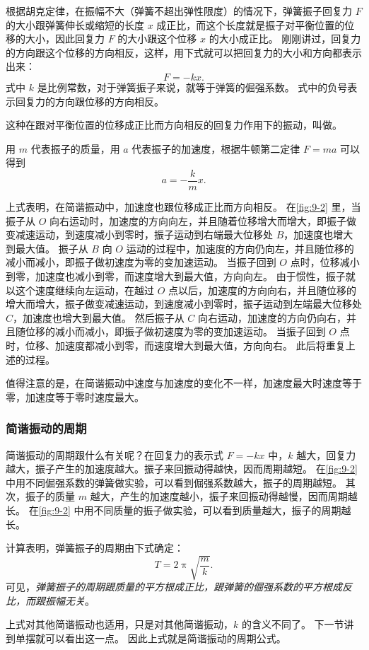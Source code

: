 根据胡克定律，在振幅不大（弹簧不超出弹性限度）的情况下，弹簧振子回复力 $F$ 的大小跟弹簧伸长或缩短的长度 $x$ 成正比，而这个长度就是振子对平衡位置的位移的大小，因此回复力 $F$ 的大小跟这个位移 $x$ 的大小成正比。
刚刚讲过，回复力的方向跟这个位移的方向相反，这样，用下式就可以把回复力的大小和方向都表示出来：
\[F=-kx.\]
式中 $k$ 是比例常数，对于弹簧振子来说，就等于弹簧的倔强系数。
式中的负号表示回复力的方向跟位移的方向相反。

这种在跟对平衡位置的位移成正比而方向相反的回复力作用下的振动，叫做。

用 $m$ 代表振子的质量，用 $a$ 代表振子的加速度，根据牛顿第二定律 $F=ma$ 可以得到
\[a=-\frac{k}{m}x.\]

上式表明，在简谐振动中，加速度也跟位移成正比而方向相反。
在\cref{fig:9-2} 里，当振子从 $O$ 向右运动时，加速度的方向向左，并且随着位移增大而增大，即振子做变减速运动，到速度减小到零时，振子运动到右端最大位移处 $B$，加速度也增大到最大值。
振子从 $B$ 向 $O$ 运动的过程中，加速度的方向仍向左，并且随位移的减小而减小，即振子做初速度为零的变加速运动。
当振子回到 $O$ 点时，位移减小到零，加速度也减小到零，而速度增大到最大值，方向向左。
由于惯性，振子就以这个速度继续向左运动，在越过 $O$ 点以后，加速度的方向向右，并且随位移的增大而增大，振子做变减速运动，到速度减小到零时，振子运动到左端最大位移处 $C$，加速度也增大到最大值。
然后振子从 $C$ 向右运动，加速度的方向仍向右，并且随位移的减小而减小，即振子做初速度为零的变加速运动。
当振子回到 $O$ 点时，位移、加速度都减小到零，而速度增大到最大值，方向向右。
此后将重复上述的过程。

值得注意的是，在简谐振动中速度与加速度的变化不一样，加速度最大时速度等于零，加速度等于零时速度最大。

\subsubsection{简谐振动的周期}
简谐振动的周期跟什么有关呢？在回复力的表示式 $F=-kx$ 中，$k$ 越大，回复力越大，振子产生的加速度越大。振子来回振动得越快，因而周期越短。
在\cref{fig:9-2} 中用不同倔强系数的弹簧做实验，可以看到倔强系数越大，振子的周期越短。
其次，振子的质量 $m$ 越大，产生的加速度越小，振子来回振动得越慢，因而周期越长。
在\cref{fig:9-2} 中用不同质量的振子做实验，可以看到质量越大，振子的周期越长。

计算表明，弹簧振子的周期由下式确定：
\[T=2\uppi\sqrt{\frac{m}{k}}.\]
可见，\emph{弹簧振子的周期跟质量的平方根成正比，跟弹簧的倔强系数的平方根成反比，而跟振幅无关}。

上式对其他简谐振动也适用，只是对其他简谐振动，$k$ 的含义不同了。
下一节讲到单摆就可以看出这一点。
因此上式就是简谐振动的周期公式。

